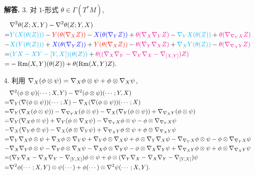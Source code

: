 \documentclass{ctexart}
\newenvironment{solution}{\par\noindent\textbf{解答. }}{\par}
\begin{document}
\begin{solution}
    3. 对 $1$-形式 $\theta \in \Gamma(T^{\ast}M)$,
    \[
        \begin{aligned}
             & \nabla^2\theta(Z; X, Y) - \nabla^2\theta(Z; Y, X) \\
            =& \textcolor{cyan}{Y(X(\theta(Z)))} - \textcolor{red}{Y(\theta(\nabla_{X}Z))} - \textcolor{blue}{X(\theta(\nabla_{Y}Z))} + \textcolor{magenta}{\theta(\nabla_{X}\nabla_{Y}Z)} - \textcolor{cyan}{\nabla_{Y}X(\theta(Z))} + \textcolor{magenta}{\theta(\nabla_{\nabla_{Y}X}Z)} \\
            -& \textcolor{cyan}{X(Y(\theta(Z)))} + \textcolor{blue}{X(\theta(\nabla_{Y}Z))} + \textcolor{red}{Y(\theta(\nabla_{X}Z))} - \textcolor{magenta}{\theta(\nabla_{Y}\nabla_{X}Z)} + \textcolor{cyan}{\nabla_{X}Y(\theta(Z))} - \textcolor{magenta}{\theta(\nabla_{\nabla_{X}Y}Z)} \\
            =& \textcolor{cyan}{(YX - XY - [Y, X])(\theta(Z))} + \textcolor{magenta}{\theta((\nabla_{X}\nabla_{Y} - \nabla_{Y}\nabla_{X} - \nabla_{[X, Y]})Z)} \\
            =& -\mathrm{Rm}(X, Y)(\theta(Z)) + \theta(\mathrm{Rm}(X, Y)Z).
        \end{aligned}
    \]

    4. 利用 $\nabla_{X}(\phi \otimes \psi) = \nabla_{X}\phi \otimes \psi + \phi \otimes \nabla_{X}\psi$,
    \[
        \begin{aligned}
         & \nabla^{2}(\phi \otimes \psi)(\cdots; X, Y) - \nabla^{2}(\phi \otimes \psi)(\cdots; Y, X) \\
        =& \nabla_{Y}(\nabla(\phi \otimes \psi))(\cdots; X) - \nabla_{X}(\nabla(\phi \otimes \psi))(\cdots; X) \\
        =& \nabla_{Y}(\nabla_{X}(\phi \otimes \psi)) - \nabla_{\nabla_{Y}{X}}(\phi \otimes \psi) - \nabla_{X}(\nabla_{Y}(\phi \otimes \psi)) + \nabla_{\nabla_{X}{Y}}(\phi \otimes \psi) \\
        =& \nabla_{Y}(\nabla_{X}\phi \otimes \psi) + \nabla_{Y}(\phi \otimes \nabla_{X}\psi) - \nabla_{\nabla_{Y}{X}}\phi \otimes \psi - \phi \otimes \nabla_{\nabla_{Y}{X}}\psi \\
        -& \nabla_{X}(\nabla_{Y}\phi \otimes \psi) - \nabla_{X}(\phi \otimes \nabla_{Y}\psi) + \nabla_{\nabla_{X}{Y}}\phi \otimes \psi + \phi \otimes \nabla_{\nabla_{X}{Y}}\psi \\
        =& \nabla_{Y}\nabla_{X}\phi \otimes \psi + \nabla_{X}\phi \otimes \nabla_{Y}\psi + \nabla_{Y}\phi \otimes \nabla_{X}\psi + \phi \otimes \nabla_{Y}\nabla_{X}\psi - \nabla_{\nabla_{Y}{X}}\phi \otimes \psi - \phi \otimes \nabla_{\nabla_{Y}{X}}\psi \\
        -& \nabla_{X}\nabla_{Y}\phi \otimes \psi - \nabla_{Y}\phi \otimes \nabla_{X}\psi - \nabla_{X}\phi \otimes \nabla_{Y}\psi - \phi \otimes \nabla_{X}\nabla_{Y}\psi + \nabla_{\nabla_{X}{Y}}\phi \otimes \psi + \phi \otimes \nabla_{\nabla_{X}{Y}}\psi \\
        =& (\nabla_{Y}\nabla_{X} - \nabla_{X}\nabla_{Y} - \nabla_{[Y, X]})\phi \otimes \psi + \phi \otimes (\nabla_{Y}\nabla_{X} - \nabla_{X}\nabla_{Y} - \nabla_{[Y, X]})\psi \\
        =& \nabla^2\phi(\cdots; X, Y) \otimes \psi(\cdots) + \phi(\cdots) \otimes \nabla^2\psi(\cdots; X, Y).
        \end{aligned}
    \]


\end{solution}
\end{document}
